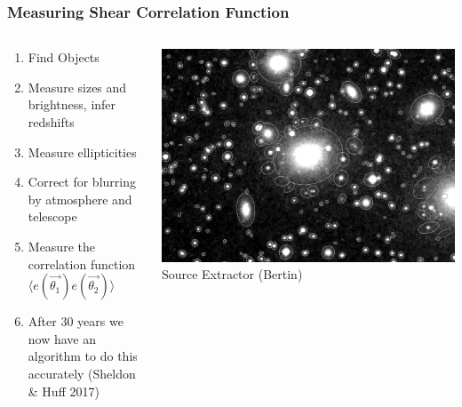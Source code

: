 \documentclass{beamer}
\begin{document}
\frame
{

    \frametitle{Measuring Shear Correlation Function}


    \begin{columns}
        \begin{column}{0.5\textwidth}
            \begin{enumerate}

                \item Find Objects

                \item Measure sizes and brightness, infer redshifts
                    
                \item Measure ellipticities

                \item Correct for blurring by atmosphere and telescope

                \item Measure the correlation function
                    {\color{gold} $\langle e(\vec{\theta_1}) e(\vec{\theta_2}) \rangle$ }

                \item After 30 years we now have an algorithm to do
                    this accurately (Sheldon \& Huff 2017)


            \end{enumerate}

        \end{column}
        \begin{column}{0.5\textwidth}

            \begin{center}
                \includegraphics[width=\textwidth]{sun226_fig.png}
                \newline
                {\tiny Source Extractor (Bertin)}
            \end{center}

        \end{column}

    \end{columns}


}
\end{document}
